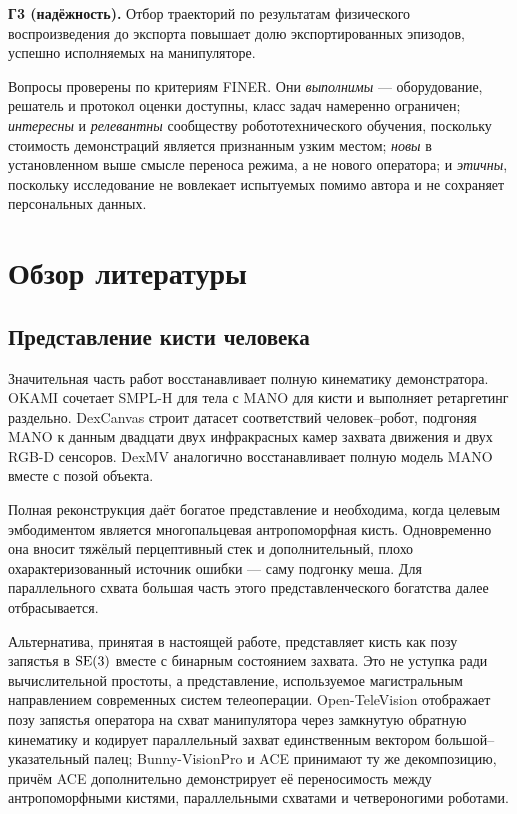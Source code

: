 \documentclass[12pt, a4paper, oneside]{report}
\begin{document}
\textbf{Г3 (надёжность).} Отбор траекторий по результатам физического
воспроизведения до экспорта повышает долю экспортированных эпизодов, успешно
исполняемых на манипуляторе.

Вопросы проверены по критериям FINER. Они \emph{выполнимы} --- оборудование,
решатель и протокол оценки доступны, класс задач намеренно ограничен;
\emph{интересны} и \emph{релевантны} сообществу робототехнического обучения,
поскольку стоимость демонстраций является признанным узким местом;
\emph{новы} в установленном выше смысле переноса режима, а не нового оператора;
и \emph{этичны}, поскольку исследование не вовлекает испытуемых помимо автора и
не сохраняет персональных данных.

\chapter{Обзор литературы}

\section{Представление кисти человека}

Значительная часть работ восстанавливает полную кинематику демонстратора. OKAMI
сочетает SMPL-H для тела с MANO для кисти и выполняет ретаргетинг раздельно.
DexCanvas строит датасет соответствий человек--робот, подгоняя MANO к данным
двадцати двух инфракрасных камер захвата движения и двух RGB-D сенсоров. DexMV
аналогично восстанавливает полную модель MANO вместе с позой объекта.

Полная реконструкция даёт богатое представление и необходима, когда целевым
эмбодиментом является многопальцевая антропоморфная кисть. Одновременно она
вносит тяжёлый перцептивный стек и дополнительный, плохо охарактеризованный
источник ошибки --- саму подгонку меша. Для параллельного схвата большая часть
этого представленческого богатства далее отбрасывается.

Альтернатива, принятая в настоящей работе, представляет кисть как позу запястья
в $\mathrm{SE}(3)$ вместе с бинарным состоянием захвата. Это не уступка ради
вычислительной простоты, а представление, используемое магистральным
направлением современных систем телеоперации. Open-TeleVision отображает позу
запястья оператора на схват манипулятора через замкнутую обратную кинематику и
кодирует параллельный захват единственным вектором большой--указательный палец;
Bunny-VisionPro и ACE принимают ту же декомпозицию, причём ACE дополнительно
демонстрирует её переносимость между антропоморфными кистями, параллельными
схватами и четвероногими роботами.
\end{document}
